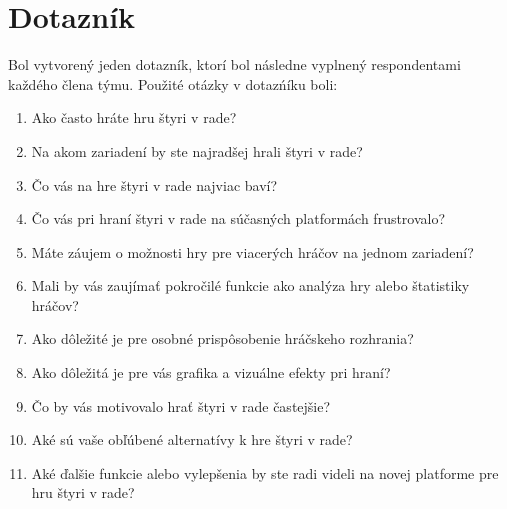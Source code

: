\documentclass[a4paper, 11pt, onecolumn]{article}
\begin{document}
\section{Dotazník}
Bol vytvorený jeden dotazník, ktorí bol následne vyplnený respondentami každého člena týmu.
Použité otázky v dotazńíku boli:
\begin{enumerate}
    \item Ako často hráte hru štyri v rade?
    \item Na akom zariadení by ste najradšej hrali štyri v rade?
    \item Čo vás na hre štyri v rade najviac baví?
    \item Čo vás pri hraní štyri v rade na súčasných platformách frustrovalo?
    \item Máte záujem o možnosti hry pre viacerých hráčov na jednom zariadení?
    \item Mali by vás zaujímať pokročilé funkcie ako analýza hry alebo štatistiky hráčov?
    \item Ako dôležité je pre osobné prispôsobenie hráčskeho rozhrania?
    \item Ako dôležitá je pre vás grafika a vizuálne efekty pri hraní?
    \item Čo by vás motivovalo hrať štyri v rade častejšie?
    \item Aké sú vaše obľúbené alternatívy k hre štyri v rade?
    \item Aké ďalšie funkcie alebo vylepšenia by ste radi videli na novej platforme pre hru štyri v rade?
\end{enumerate}
\end{document}
